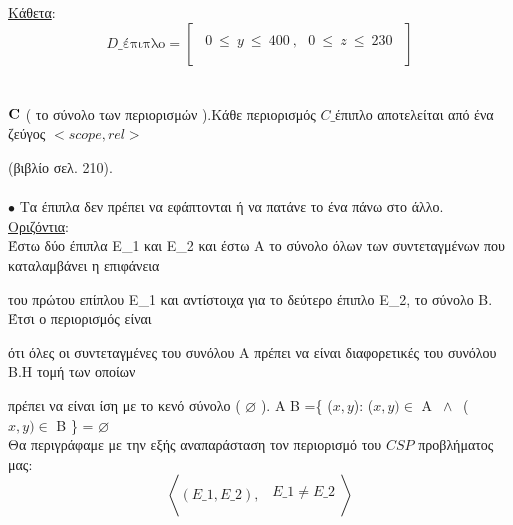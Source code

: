 \documentclass[10pt]{article}
\begin{document}
\hspace{20mm}\underline{Κάθετα}:
\[  D\text{\_έπιπλο} =
\left[ 
\begin{array}{ll}
\\
     \ \  0 \ \leq \ y \ \leq \ 400 \ , \ \ \ 0 \ \leq \ z \ \leq \ 230 \ \
     \\ \\
     \end{array} 
\right ] \] 
\\ \\

$\bf C$ \normalfont ( το σύνολο των περιορισμών ).Κάθε περιορισμός $C\_$έπιπλο αποτελείται από ένα ζεύγος $<scope,rel>$

\hspace{5mm}(βιβλίο σελ. 210).
\\ \\

\hspace{10mm}$\bullet$ Τα έπιπλα δεν πρέπει να εφάπτονται ή να πατάνε το ένα πάνω στο άλλο. \\

\hspace{15mm}\underline{Oριζόντια}: \\ 

\hspace{15mm}Έστω δύο έπιπλα Ε\_1 και Ε\_2  και έστω Α το σύνολο όλων των συντεταγμένων που καταλαμβάνει η επιφάνεια 

\hspace{15mm}του πρώτου επίπλου  Ε\_1 και αντίστοιχα για το δεύτερο έπιπλο  Ε\_2, το σύνολο Β. Έτσι ο περιορισμός είναι 

\hspace{15mm}ότι όλες οι συντεταγμένες του συνόλου Α πρέπει να είναι διαφορετικές του συνόλου Β.Η τομή των οποίων 

\hspace{15mm}πρέπει να είναι ίση με το κενό σύνολο ( $\varnothing$ ).  Α Β =\{ ($x,y$): ($x,y) \in $ Α $ \ \land \ $  ($x,y) \in $ Β \} = $\varnothing$ \\

\hspace{15mm}Θα περιγράφαμε με την εξής αναπαράσταση τον περιορισμό του $CSP$ προβλήματος μας: \\

\[ 
\left<   (E\_1, E\_2) , 
\begin{array}{ll}
\\  \ \ E\_1 \neq E\_2 \\ \\
     
     \end{array} 
\right > \] 
\\ 
\end{document}
